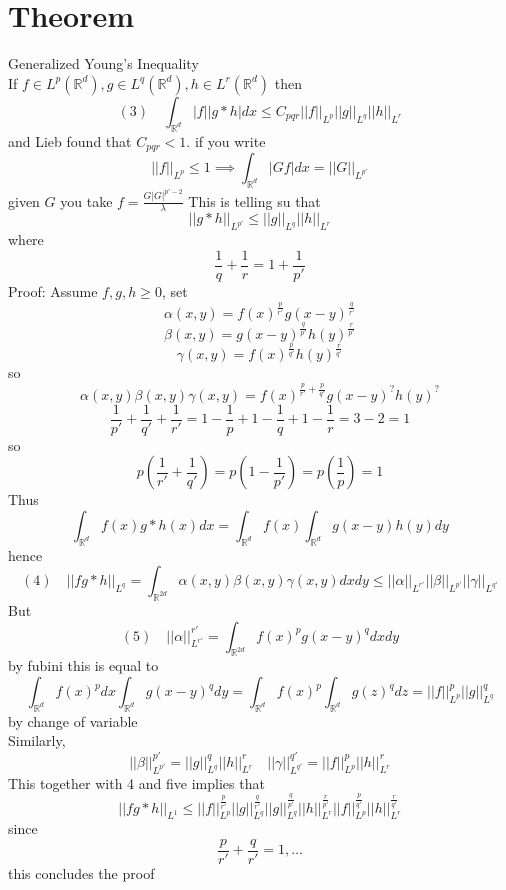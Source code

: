 \documentclass[11pt]{article}
\begin{document}
\section{Theorem} Generalized Young's Inequality\\
If $f \in L^{p}( \mathbb{R}^{d}), g \in L^{q}( \mathbb{R}^{d}), h \in L^{r}( \mathbb{R}^{d})$ then
\[
    (3) \quad    \int_{ \mathbb{R}^{d}}^{}|f||g*h|dx \le C_{pqr}||f||_{L^{p}}||g||_{L^{q}}||h||_{L^{r}}
\] 
and Lieb found that $C_{pqr} < 1$.
if you write
\[
    ||f||_{L^{p}} \le 1 \implies \int_{ \mathbb{R}^{d}}^{}|Gf|dx = ||G||_{L^{p'}}
\] 
given $G$ you take  $f = \frac{G|G|^{p'-2}}{\lambda}$ 
This is telling su that
\[
    ||g*h||_{L^{p'}} \le ||g||_{L^{q}} ||h||_{L^{r}}
\] 
where
\[
\frac{1}{q} + \frac{1}{r} = 1 + \frac{1}{p'}
\] 
Proof: Assume $f, g, h \ge 0$, set
 \[
\alpha(x,y) = f(x)^{\frac{p}{r'}}g(x-y)^{\frac{q}{r'}}
\] 
\[
\beta(x,y) = g(x-y)^{\frac{q}{p'}} h(y)^{\frac{r}{p'}} 
\] 
\[
\gamma(x,y) = f(x)^{\frac{p}{q'}}h(y)^{\frac{r}{q'}}
\] 
so
\[
\alpha(x,y)\beta(x,y)\gamma(x,y) = f(x)^{\frac{p}{r'}+\frac{p}{q'}}g(x-y)^{?}h(y)^{?}
\] 
\[
\frac{1}{p'} + \frac{1}{q'} + \frac{1}{r'} = 1 - \frac{1}{p} + 1 - \frac{1}{q} + 1 - \frac{1}{r} = 3 -2 = 1
\] 
so
\[
p(\frac{1}{r'} + \frac{1}{q'}) = p(1-\frac{1}{p'}) = p(\frac{1}{p}) = 1
\] 
Thus
\[
\int_{ \mathbb{R}^{d}}^{}f(x) g * h(x)dx = \int_{  \mathbb{R}^{d}}^{}f(x) \int_{ \mathbb{R}^{d}}^{}g(x-y)h(y)dy
\] 
hence
\[
    (4) \quad   ||f g*h||_{L^{q}} = \int_{ \mathbb{R}^{2d}}^{}\alpha(x,y)\beta(x,y)\gamma(x,y)dxdy \le ||\alpha||_{L^{r'}}||\beta||_{L^{p'}}||\gamma||_{L^{q'}}
\] 
But
\[
    (5) \quad   ||\alpha||_{L^{r'}}^{r'} = \int_{ \mathbb{R}^{2d}}^{}f(x)^{p}g(x-y)^{q}dxdy
\] 
by fubini this is equal to 
\[
    \int_{ \mathbb{R}^{d}}^{}f(x)^{p}dx \int_{ \mathbb{R}^{d}}^{}g(x-y)^{q}dy = \int_{ \mathbb{R}^{d}}^{}f(x)^{p}\int_{ \mathbb{R}^{d}}^{}g(z)^{q}dz = ||f||_{L^{p}}^{p}||g||_{L^{q}}^{q}
\] 
by change of variable\\
Similarly,
\[
    ||\beta||_{L^{p'}}^{p'} = ||g||_{L^{q}}^{q}||h||_{L^{r}}^{r} \quad ||\gamma||_{L^{q'}}^{q'} = ||f||_{L^{p}}^{p}||h||_{L^{r}}^{r}
\] 
This together with 4 and five implies that
\[
    ||f g * h||_{L^{1}} \le ||f||_{L^{p}}^{\frac{p}{r'}}||g||_{L^{q}}^{\frac{q}{r'}}||g||_{L^{q}}^{\frac{q}{p'}} ||h||_{L^{r}}^{\frac{r}{p'}}||f||_{L^{p}}^{\frac{p}{q'}}||h||_{L^{r}}^{\frac{r}{q'}}
\] 
since
\[
\frac{p}{r'} + \frac{q}{r'} = 1 ,\dots
\] 
this concludes the proof
\end{document}

